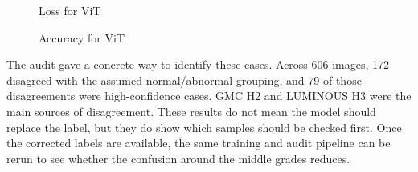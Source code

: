 \begin{figure}[H]
    \centering
    \caption{Loss for ViT}
    \label{fig:training_loss}
\end{figure}

\begin{figure}[H]
    \centering
    \caption{Accuracy for ViT}
    \label{fig:training_accuracy}
\end{figure}

The audit gave a concrete way to identify these cases. Across 606 images, 172 disagreed with the assumed normal/abnormal grouping, and 79 of those disagreements were high-confidence cases. GMC H2 and LUMINOUS H3 were the main sources of disagreement. These results do not mean the model should replace the label, but they do show which samples should be checked first. Once the corrected labels are available, the same training and audit pipeline can be rerun to see whether the confusion around the middle grades reduces.

